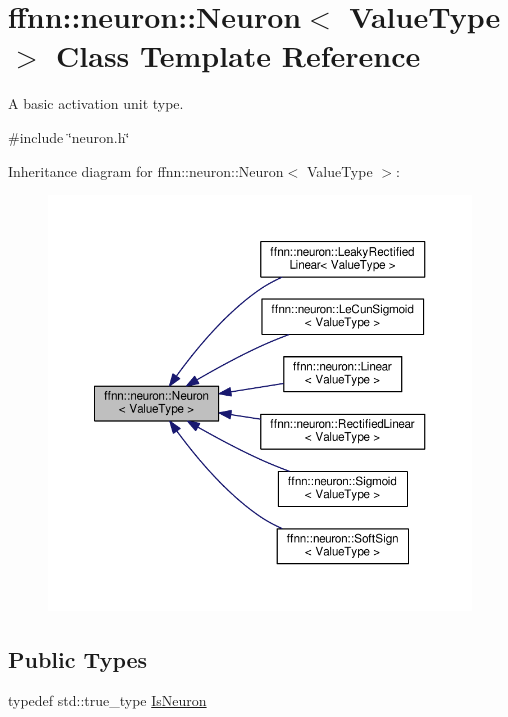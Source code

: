 \hypertarget{classffnn_1_1neuron_1_1_neuron}{\section{ffnn\-:\-:neuron\-:\-:Neuron$<$ Value\-Type $>$ Class Template Reference}
\label{classffnn_1_1neuron_1_1_neuron}
}


A basic activation unit type.  




{\ttfamily \#include \char`\"{}neuron.\-h\char`\"{}}



Inheritance diagram for ffnn\-:\-:neuron\-:\-:Neuron$<$ Value\-Type $>$\-:\nopagebreak
\begin{figure}[H]
\begin{center}
\leavevmode
\includegraphics[width=350pt]{classffnn_1_1neuron_1_1_neuron__inherit__graph}
\end{center}
\end{figure}
\subsection*{Public Types}
\begin{DoxyCompactItemize}
\item 
typedef std\-::true\-\_\-type \hyperlink{classffnn_1_1neuron_1_1_neuron_a75bfde562dcb9d0e606f52ca73451de8}{Is\-Neuron}
\end{DoxyCompactItemize}
